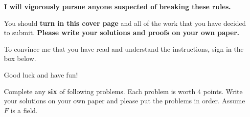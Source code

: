 \documentclass[11pt]{scrartcl}
\theoremstyle{definition}
\begin{document}
\begin{center}
\textbf{I will vigorously pursue anyone suspected of breaking these rules.}
\end{center}

\bigskip

You should \textbf{turn in this cover page} and all of the work that you have decided to submit. \textbf{Please write your solutions and proofs on your own paper.}

\bigskip

To convince me that you have read and understand the instructions, sign in the box below.

\bigskip


\bigskip

Good luck and have fun!

\newpage

Complete any \textbf{six} of following problems.  Each problem is worth 4 points. Write your solutions on your own paper and please put the problems in order. Assume $F$ is a field.
\end{document}
